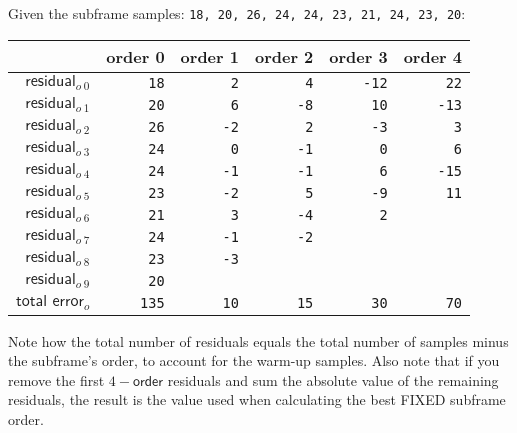 Given the subframe samples: \texttt{18, 20, 26, 24, 24, 23, 21, 24, 23, 20}:
\begin{table}[h]
\begin{tabular}{r|r|r|r|r|r}
& \textsf{order} 0 & \textsf{order} 1 & \textsf{order} 2 & \textsf{order} 3 & \textsf{order} 4 \\
\hline
$\textsf{residual}_{o~0}$ & \texttt{\color{gray}18} & \texttt{\color{gray}2} & \texttt{\color{gray}4} & \texttt{\color{gray}-12} & \texttt{22} \\
$\textsf{residual}_{o~1}$ & \texttt{\color{gray}20} & \texttt{\color{gray}6} & \texttt{\color{gray}-8} & \texttt{10} & \texttt{-13} \\
$\textsf{residual}_{o~2}$ & \texttt{\color{gray}26} & \texttt{\color{gray}-2} & \texttt{2} & \texttt{-3} & \texttt{3} \\
$\textsf{residual}_{o~3}$ & \texttt{\color{gray}24} & \texttt{0} & \texttt{-1} & \texttt{0} & \texttt{6} \\
$\textsf{residual}_{o~4}$ & \texttt{24} & \texttt{-1} & \texttt{-1} & \texttt{6} & \texttt{-15} \\
$\textsf{residual}_{o~5}$ & \texttt{23} & \texttt{-2} & \texttt{5} & \texttt{-9} & \texttt{11} \\
$\textsf{residual}_{o~6}$ & \texttt{21} & \texttt{3} & \texttt{-4} & \texttt{2} \\
$\textsf{residual}_{o~7}$ & \texttt{24} & \texttt{-1} & \texttt{-2} \\
$\textsf{residual}_{o~8}$ & \texttt{23} & \texttt{-3} \\
$\textsf{residual}_{o~9}$ & \texttt{20} \\
\hline
$\textsf{total error}_{o}$ & \texttt{135} & \texttt{10} & \texttt{15} & \texttt{30} & \texttt{70} \\
\end{tabular}
\end{table}
\par
\noindent
Note how the total number of residuals equals the
total number of samples minus the subframe's order,
to account for the warm-up samples.
Also note that if you remove the first $4 - \textsf{order}$ residuals
and sum the absolute value of the remaining residuals,
the result is the  value
used when calculating the best FIXED subframe order.

\clearpage

